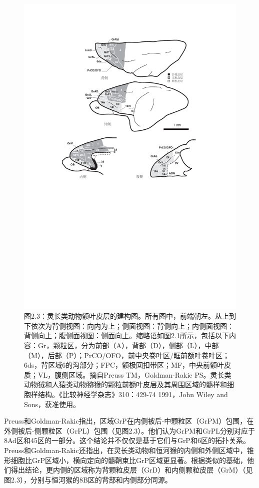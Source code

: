 \begin{figure}[!htb]
	\centering
	\includegraphics[width=0.8\linewidth]{image_pfc/Fig_2_3}
	\caption*{图2.3：灵长类动物额叶皮层的建构图。所有图中，前端朝左。从上到下依次为背侧视图：向内为上；侧面视图：背侧向上；内侧面视图：背侧向上；腹侧面视图：侧面向上。缩略语如图2.1所示，包括以下内容：Gr，颗粒区，分为前部（A），背部（D），侧部（L），中部（M），后部（P）；PrCO/OFO，前中央卷叶区/眶前额叶卷叶区；6ds，背区域6的沟部分；FPC，额极回扣带区；MF，中央前额叶皮质；VL，腹侧区域。摘自Preuss TM，Goldman-Rakic PS。灵长类动物狨和人猿类动物猕猴的颗粒前额叶皮层及其周围区域的髓样和细胞样结构。《比较神经学杂志》310：429-74  1991，John Wiley and Sons，获准使用。}
\end{figure}

Preuss和Goldman-Rakic指出，区域GrP在内侧被后-中颗粒区（GrPM）包围，在外侧被后-侧颗粒区（GrPL）包围（见图2.3）。他们认为GrPM和GrPL分别对应于8Ad区和45区的一部分。这个结论并不仅仅是基于它们与GrP和6区的拓扑关系。Preuss和Goldman-Rakic还指出，在灵长类动物和恒河猴的内侧和外侧区域中，锥形细胞比GrP区域小，横向定向的髓鞘束比GrP区域更显著。根据类似的基础，他们得出结论，更内侧的区域称为背颗粒皮层（GrD）和内侧颗粒皮层（GrM）（见图2.3），分别与恒河猴的8B区的背部和内侧部分同源。

